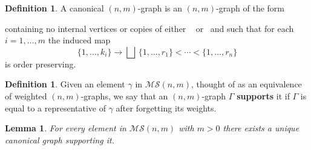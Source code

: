\documentclass{amsart}
\newcommand{\MS}{\mathcal{MS}}
\renewcommand{\1}{\mathbf{1}}
\newtheorem{lemma}[theorem]{Lemma}
\theoremstyle{definition}
\newtheorem{definition}[theorem]{Definition}
\begin{document}
\begin{definition} \label{definition: surjection-like element}
	A canonical $(n,m)$-graph is an $(n,m)$-graph of the form 
	\begin{center}
	\end{center}
	containing no internal vertices or copies of either\, \counit\ \,or \involution\ and such that for each $i = 1, \dots, m$ the induced map 
	\begin{equation*}
	\{1,\dots,k_i\} \to \bigsqcup\, \{1,\dots,r_1\} <  \cdots < \{1,\dots,r_n\}
	\end{equation*}
	is order preserving.
\end{definition}

\begin{definition}
	Given an element $\gamma$ in $\MS(n,m)$, thought of as an equivalence of weighted $(n,m)$-graphs, we say that an $(n,m)$-graph $\Gamma$ \textbf{supports} it if $\Gamma$ is equal to a representative of $\gamma$ after forgetting its weights.
\end{definition}

\begin{lemma} \label{lemma: unique surjection-like representative}
	For every element in $\MS(n,m)$ with $m>0$ there exists a unique canonical graph supporting it.
\end{lemma}
\end{document}
